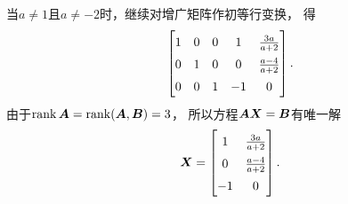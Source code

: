 \begin{example}
\begin{solution}
当\(a\neq1\)且\(a\neq-2\)时，继续对增广矩阵作初等行变换，
得\begin{equation*}
	\def\arraystretch{1.5}
	\begin{bmatrix}
		1 & 0 & 0 & 1 & \frac{3a}{a+2} \\
		0 & 1 & 0 & 0 & \frac{a-4}{a+2} \\
		0 & 0 & 1 & -1 & 0
	\end{bmatrix}.
\end{equation*}
由于\(\rank\boldsymbol{A} = \rank(\boldsymbol{A},\boldsymbol{B}) = 3\)，
所以方程\(\boldsymbol{A}\boldsymbol{X}=\boldsymbol{B}\)有唯一解\begin{equation*}
	\def\arraystretch{1.5}
	\vb{X} = \begin{bmatrix}
		1 & \frac{3a}{a+2} \\
		0 & \frac{a-4}{a+2} \\
		-1 & 0
	\end{bmatrix}.
\end{equation*}
\end{solution}
\end{example}
